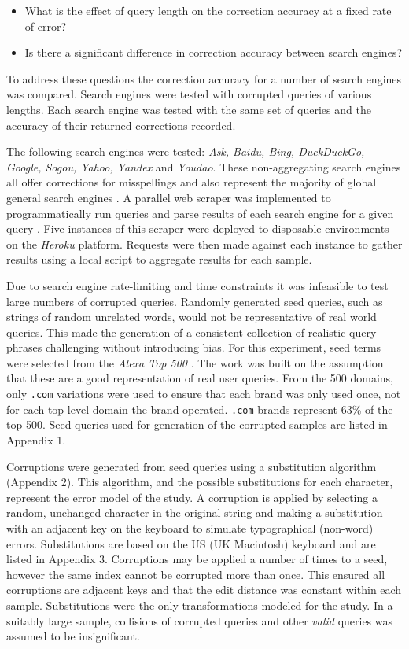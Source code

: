 \documentclass{csfourzero}
\begin{document}
\begin{itemize}
  \item{What is the effect of query length on the correction accuracy at a fixed rate of error?}
  \item{Is there a significant difference in correction accuracy between search engines?}
\end{itemize}

\noindent
To address these questions the correction accuracy for a number of search engines was compared. Search engines were tested with corrupted queries of various lengths. Each search engine was tested with the same set of queries and the accuracy of their returned corrections recorded.

The following search engines were tested: \textit{Ask, Baidu, Bing, DuckDuckGo, Google, Sogou, Yahoo, Yandex} and \textit{Youdao}. These non-aggregating search engines all offer corrections for misspellings and also represent the majority of global general search engines \cite{searchenginewiki}. A parallel web scraper was implemented to programmatically run queries and parse results of each search engine for a given query \cite{scraper}. Five instances of this scraper were deployed to disposable environments on the \textit{Heroku} platform. Requests were then made against each instance to gather results using a local script to aggregate results for each sample.

Due to search engine rate-limiting and time constraints it was infeasible to test large numbers of corrupted queries. Randomly generated seed queries, such as strings of random unrelated words, would not be representative of real world queries. This made the generation of a consistent collection of realistic query phrases challenging without introducing bias. For this experiment, seed terms were selected from the \textit{Alexa Top 500} \cite{alexatop500}. The work was built on the assumption that these are a good representation of real user queries. From the 500 domains, only \texttt{.com} variations were used to ensure that each brand was only used once, not for each top-level domain the brand operated. \texttt{.com} brands represent 63\% of the top 500. Seed queries used for generation of the corrupted samples are listed in Appendix 1.

Corruptions were generated from seed queries using a substitution algorithm (Appendix 2). This algorithm, and the possible substitutions for each character, represent the error model of the study. A corruption is applied by selecting a random, unchanged character in the original string and making a substitution with an adjacent key on the keyboard to simulate typographical (non-word) errors. Substitutions are based on the US (UK Macintosh) keyboard and are listed in Appendix 3. Corruptions may be applied a number of times to a seed, however the same index cannot be corrupted more than once. This ensured all corruptions are adjacent keys and that the edit distance was constant within each sample. Substitutions were the only transformations modeled for the study. In a suitably large sample, collisions of corrupted queries and other \textit{valid} queries was assumed to be insignificant.
\end{document}
